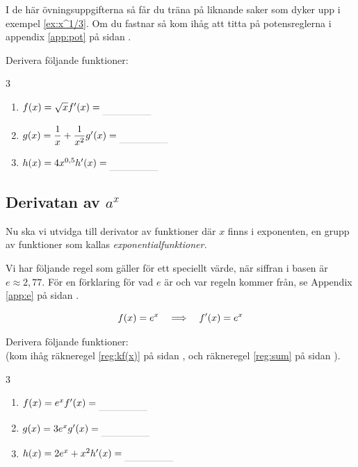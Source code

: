 \documentclass[a4paper, 12pt]{article}
\begin{document}
I de här övningsuppgifterna så får du träna på liknande saker som dyker upp i exempel \ref{ex:x^1/3}. Om du fastnar så kom ihåg att titta på potensreglerna i appendix \ref{app:pot} på sidan \pageref{app:pot}.


\begin{uppgifter}
    \label{upp:x^1/3}
    Derivera följande funktioner:
    \begin{multicols}{3}
        \begin{enumerate}
            \item $f(x) = \sqrt{x} \\ f'(x) \ans$
            \item $g(x) = \dfrac 1{x} + \dfrac 1{x^2} \\ g'(x) \ans$
            \item $h(x) = 4x^{0,5} \\ h'(x) \ans$
        \end{enumerate}
    \end{multicols}
\end{uppgifter}

\subsection{Derivatan av $a^x$}
Nu ska vi utvidga till derivator av funktioner där $x$ finns i exponenten, en grupp av funktioner som kallas \emph{exponentialfunktioner.}

Vi har följande regel som gäller för ett speciellt värde, när siffran i basen är $e \approx 2,77$. För en förklaring för vad $e$ är och var regeln kommer från, se Appendix \ref*{app:e} på sidan \pageref*{app:e}.

\begin{regel}
    \[f(x) = e^x \hspace{1em} \Longrightarrow \hspace{1em} f'(x) = e^x \]
\end{regel}

\begin{uppgifter} 
    \label{upp:e^x}
    Derivera följande funktioner: \\(kom ihåg räkneregel \ref*{reg:kf(x)} på sidan \pageref*{reg:kf(x)}, och räkneregel \ref*{reg:sum} på sidan \pageref*{reg:sum}).
    \begin{multicols}{3}
        \begin{enumerate}
            \item $f(x) = e^x \\ f'(x) \ans$
            \item $g(x) = 3e^x \\ g'(x) \ans$
            \item $h(x) = 2e^x + x^2 \\ h'(x) \ans$
        \end{enumerate}
    \end{multicols}
\end{uppgifter}
\end{document}
